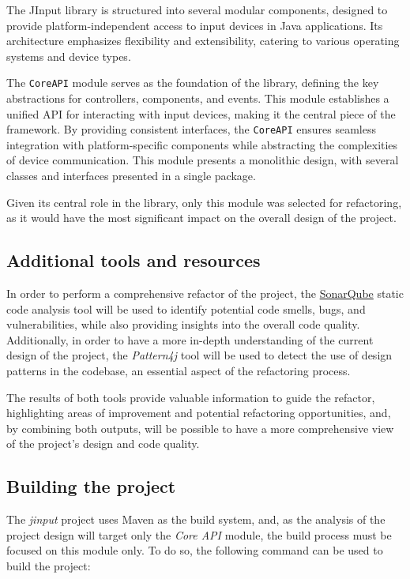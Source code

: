 The JInput library is structured into several modular components, designed to provide platform-independent access to input devices in Java applications. Its architecture emphasizes flexibility and extensibility, catering to various operating systems and device types.

The \texttt{CoreAPI} module serves as the foundation of the library, defining the key abstractions for controllers, components, and events. This module establishes a unified API for interacting with input devices, making it the central piece of the framework. By providing consistent interfaces, the \texttt{CoreAPI} ensures seamless integration with platform-specific components while abstracting the complexities of device communication. This module presents a monolithic design, with several classes and interfaces presented in a single package.

Given its central role in the library, only this module was selected for refactoring, as it would have the most significant impact on the overall design of the project.

\subsection{Additional tools and resources}

In order to perform a comprehensive refactor of the project, the \href{https://www.sonarsource.com/}{SonarQube} static code analysis tool will be used to identify potential code smells, bugs, and vulnerabilities, while also providing insights into the overall code quality. Additionally, in order to have a more in-depth understanding of the current design of the project, the \textit{Pattern4j} tool will be used to detect the use of design patterns in the codebase, an essential aspect of the refactoring process.

The results of both tools provide valuable information to guide the refactor, highlighting areas of improvement and potential refactoring opportunities, and, by combining both outputs, will be possible to have a more comprehensive view of the project's design and code quality.

\subsection{Building the project}

The \emph{jinput} project uses Maven as the build system, and, as the analysis of the project design will target only the \emph{Core API} module, the build process must be focused on this module only. To do so, the following command can be used to build the project:

